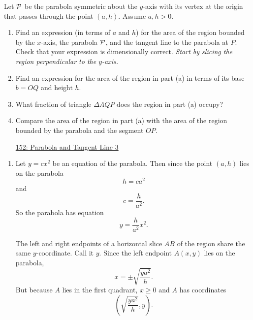 \documentclass{ximera}
\begin{document}
\begin{question} \label{Q88w4448ewe}
Let ${\cal P}$ be the parabola symmetric about the $y$-axis with its vertex at the origin that passes through the point $(a,h)$. Assume $a,h>0$.

\begin{enumerate}

\item Find an expression (in terms of $a$ and $h$) for the area of the region bounded by the $x$-axis, the parabola ${\cal P}$, and the tangent line to the parabola at $P$. Check that your expression is dimensionally correct. \emph{Start by slicing the region perpendicular to the $y$-axis.}

\item Find an expression for the area of the region in part (a) in terms of its base $b=OQ$ and height $h$.

\item What fraction of triangle $\Delta AQP$ does the region in part (a) occupy?

\item Compare the area of the region in part (a) with the area of the region bounded by the parabola and the segment $OP$.

\begin{onlineOnly}
    \begin{center}
\end{center}
\end{onlineOnly}

\href{https://www.desmos.com/calculator/avl2r9dubt}{152: Parabola and Tangent Line 3}

\end{enumerate}

\begin{explanation}
\begin{enumerate}

\item Let $y=cx^2$ be an equation of the parabola. Then since the point $(a,h)$ lies on the parabola
\[
  h = ca^2
\]
and 
\[
 c = \frac{h}{a^2} .
\]
So the parabola has equation
\[
   y = \frac{h}{a^2}x^2.
\]
 
The left and right endpoints of a horizontal slice $AB$ of the region share the same $y$-coordinate. Call it $y$. Since the left endpoint $A(x,y)$ lies on the parabola, 
\[
    x = \pm \sqrt{\frac{ya^2}{h}} .
\]
But because $A$ lies in the first quadrant, $x\geq 0$ and $A$ has coordinates
\[
       \left(  \sqrt{\frac{ya^2}{h}} , y \right) .
\]


\end{enumerate}
\end{explanation}
\end{question}
\end{document}
